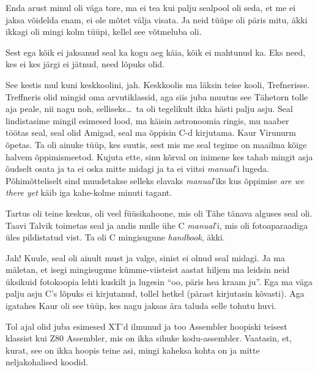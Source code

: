 
Enda arust minul oli väga tore, ma ei tea kui palju sealpool oli seda, et me ei 
jaksa võidelda enam, ei ole mõtet välja visata. Ja neid tüüpe oli päris mitu, 
äkki ikkagi oli mingi kolm tüüpi, kellel see võtmeluba  oli. 


Sest ega kõik ei jaksanud seal ka kogu aeg käia, kõik ei mahtunud ka. Eks need, 
kes ei kes järgi ei jätnud, need lõpuks olid. 


See kestis mul kuni keskkoolini, jah. Keskkoolis ma läksin teise kooli, 
Trefnerisse. Treffneris olid  mingid 
oma arvutiklassid, aga siis juba  muutus see Tähetorn 
tolle aja peale, nii nagu noh, selliseks\ldots\ ta oli tegelikult ikka hästi 
palju asju. Seal lindistasime mingil esimesed lood, ma käisin astronoomia 
ringis, mu naaber töötas seal, seal olid Amigad, seal ma õppisin 
C-d kirjutama. Kaur Virunurm õpetas. 
Ta oli ainuke tüüp, kes suutis, sest mis me seal tegime on maailma kõige halvem 
õppimismeetod. Kujuta ette, sinu kõrval on inimene kes tahab mingit asja 
õudselt osata ja ta ei oska mitte midagi ja ta ei viitsi \emph{manual}'i 
lugeda. Põhimõtteliselt sind muudetakse selleks elavaks \emph{manual}'iks kus 
õppimise \emph{are we there yet} käib iga kahe-kolme minuti tagant.

Tartus oli teine keskus, oli veel füüsikahoone, mis oli Tähe tänava alguses seal oli. Taavi 
Talvik toimetas seal ja andis mulle ühe C 
\emph{manual}'i, mis oli fotoaparaadiga üles pildistatud vist. Ta oli C 
mingisugune \emph{handbook}, äkki.


Jah! Kuule, seal oli ainult must ja valge, sinist ei olnud seal midagi. Ja ma 
mäletan, et  isegi mingisugune kümme-viisteist aastat hiljem ma leidsin neid 
üksikuid fotokoopia lehti kuskilt ja lugesin \enquote{oo, päris hea kraam ju}. 
Ega ma väga palju asju C's lõpuks ei kirjutanud, tollel hetkel 
(pärast kirjutasin kõvasti). Aga igatahes Kaur oli 
see tüüp, kes nagu jaksas ära taluda selle tohutu huvi. 

Tol ajal olid juba esimesed XT'd ilmunud ja too 
Assembler hoopiski teisest klassist kui Z80 Assembler, 
mis on ikka sihuke kodu-assembler. Vaatasin, et, kurat, see on ikka hoopis 
teine asi, mingi kaheksa kohta on ja mitte neljakohalised koodid. 

